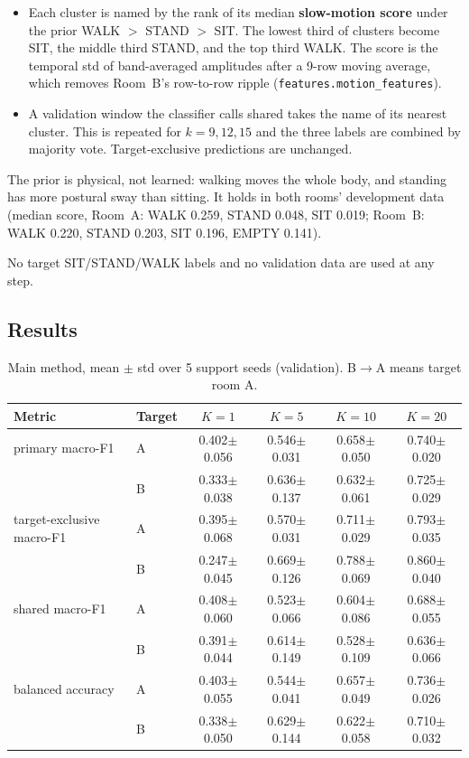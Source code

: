 \documentclass[11pt,a4paper]{article}
\begin{document}
\begin{enumerate}
\begin{itemize}
    \item Each cluster is named by the rank of its median \textbf{slow-motion score} under the prior WALK $>$ STAND $>$ SIT. The lowest third of clusters become SIT, the middle third STAND, and the top third WALK. The score is the temporal std of band-averaged amplitudes after a 9-row moving average, which removes Room~B's row-to-row ripple (\texttt{features.motion\_features}).
    \item A validation window the classifier calls shared takes the name of its nearest cluster. This is repeated for $k=9,12,15$ and the three labels are combined by majority vote. Target-exclusive predictions are unchanged.
  \end{itemize}
  The prior is physical, not learned: walking moves the whole body, and standing has more postural sway than sitting. It holds in both rooms' development data (median score, Room~A: WALK 0.259, STAND 0.048, SIT 0.019; Room~B: WALK 0.220, STAND 0.203, SIT 0.196, EMPTY 0.141).
\end{enumerate}
No target SIT/STAND/WALK labels and no validation data are used at any step.

\subsection{Results}
\begin{table}[H]
\centering\small
\caption{Main method, mean $\pm$ std over 5 support seeds (validation). B$\to$A means target room A.}
\label{tab:t3}
\begin{tabular}{llcccc}
\toprule
Metric & Target & $K=1$ & $K=5$ & $K=10$ & $K=20$\\
\midrule
primary macro-F1 & A & 0.402$\pm$0.056 & 0.546$\pm$0.031 & 0.658$\pm$0.050 & 0.740$\pm$0.020\\
 & B & 0.333$\pm$0.038 & 0.636$\pm$0.137 & 0.632$\pm$0.061 & 0.725$\pm$0.029\\
target-exclusive macro-F1 & A & 0.395$\pm$0.068 & 0.570$\pm$0.031 & 0.711$\pm$0.029 & 0.793$\pm$0.035\\
 & B & 0.247$\pm$0.045 & 0.669$\pm$0.126 & 0.788$\pm$0.069 & 0.860$\pm$0.040\\
shared macro-F1 & A & 0.408$\pm$0.060 & 0.523$\pm$0.066 & 0.604$\pm$0.086 & 0.688$\pm$0.055\\
 & B & 0.391$\pm$0.044 & 0.614$\pm$0.149 & 0.528$\pm$0.109 & 0.636$\pm$0.066\\
balanced accuracy & A & 0.403$\pm$0.055 & 0.544$\pm$0.041 & 0.657$\pm$0.049 & 0.736$\pm$0.026\\
 & B & 0.338$\pm$0.050 & 0.629$\pm$0.144 & 0.622$\pm$0.058 & 0.710$\pm$0.032\\
\bottomrule
\end{tabular}
\end{table}
\end{document}
